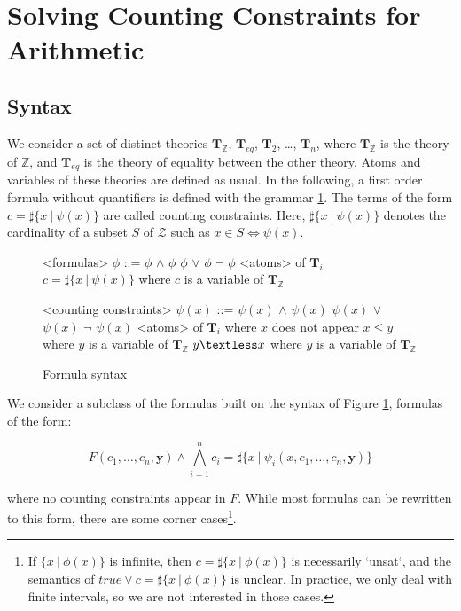 \documentclass[]{article}
\begin{document}
\section{Solving Counting Constraints for Arithmetic}

\subsection{Syntax}

We consider a set of distinct theories $\mathbf{T}_\mathbb{Z}$,
$\mathbf{T}_{eq}$, $\mathbf{T}_2$, \ldots{}, $\mathbf{T}_n$, where
$\mathbf{T}_\mathbb{Z}$ is the theory of $\mathbb{Z}$, and
$\mathbf{T}_{eq}$ is the theory of equality between the other theory.
Atoms and variables of these theories are defined as usual. In the
following, a first order formula without quantifiers is defined with the
grammar \ref{formula}. The terms of the form
$c = \sharp\{ x\ |\ \psi(x) \}$ are called counting constraints. Here,
$\sharp\{ x\ |\ \psi(x)\}$ denotes the cardinality of a subset $S$
of $\mathcal{Z}$ such as $x \in S \iff \psi(x)$.

\begin{figure}[h]
\begin{grammar}
    
<formulas> $\phi$ ::= $\phi$ $\land$ $\phi$
\alt $\phi$ $\lor$ $\phi$
\alt $\lnot$ $\phi$
\alt <atoms> of $\mathbf{T}_i$
\alt $c = \sharp\{ x\ |\ \psi(x) \}$ where $c$ is a variable of $\mathbf{T}_\mathbb{Z}$

<counting constraints> $\psi(x)$ ::= $\psi(x)$ $\land$ $\psi(x)$
\alt $\psi(x)$ $\lor$ $\psi(x)$
\alt $\lnot$ $\psi(x)$
\alt <atoms> of $\mathbf{T}_i$ where $x$ does not appear
\alt $x \leq y$ where $y$ is a variable of $\mathbf{T}_\mathbb{Z}$
\alt $y \textless x$ where $y$ is a variable of $\mathbf{T}_\mathbb{Z}$


\end{grammar}

\caption{Formula syntax}
\label{formula}
\end{figure}

We consider a subclass of the formulas built on the syntax of Figure
\ref{formula}, formulas of the form:

\begin{equation}
F(c_1, \ldots, c_n, \mathbf{y}) \land \bigwedge\limits_{i=1}^n c_i = \sharp\{ x \ |\ \psi_i(x, c_1, \ldots, c_n,
\mathbf{y})\}
\label{maingoal}
\end{equation}

where no counting constraints appear in $F$. While most formulas can
be rewritten to this form, there are some corner
cases\footnote{If $\{x\ |\ \phi(x)\}$ is infinite, then $c = \sharp\{x\ |\ \phi(x)\}$ is necessarily `unsat`, and the semantics of $true \lor c = \sharp\{x\ |\ \phi(x)\}$ is unclear. In practice, we only deal with finite intervals, so we are not interested in those cases.}.
\end{document}
